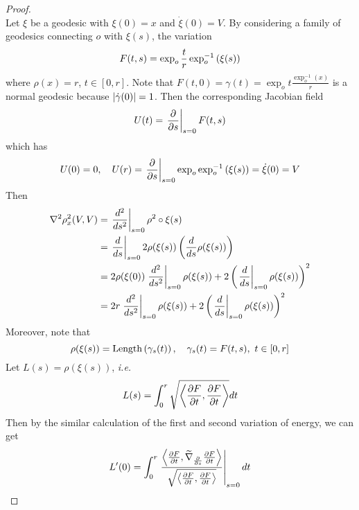 \begin{enumerate}[label=\arabic{*}.]
\begin{proof}
\begin{equation*}
		\end{equation*}
		Let $\xi$ be a geodesic with $\xi(0) = x$ and $\dot{\xi}(0) = V$. By considering a family of geodesics connecting $o$ with $\xi(s)$, the variation
		\begin{equation*}
			F(t,s) = \exp_o \frac{t}{r}\exp_o^{-1}\left(\xi(s)\right)
		\end{equation*}
		where $\rho(x) = r$, $t\in [0,r]$. Note that $F(t,0) = \gamma(t) = \exp_o t \frac{\exp_o^{-1}(x)}{r}$ is a normal geodesic because $\left\lvert\dot{\gamma}(0)\right\lvert = 1$. Then the corresponding Jacobian field
		\begin{equation*}
			U(t) = \left.\frac{\partial}{\partial s}\right\lvert_{s = 0} F(t,s)
		\end{equation*}
		which has
		\begin{equation*}
			U(0) = 0,\quad U(r) =  \left.\frac{\partial}{\partial s}\right\lvert_{s = 0} \exp_o \exp_o^{-1}\left(\xi(s)\right) = \dot{\xi}(0) = V
		\end{equation*}
		Then
		\begin{equation*}
			\begin{aligned}
				\nabla^2\rho^2_x(V,V) &= \left.\frac{d^2}{ds^2}\right\lvert_{s=0}\rho^2 \circ \xi(s)\\
				&= \left.\frac{d}{ds}\right\lvert_{s=0}2\rho(\xi(s))\left(\frac{d}{ds}\rho(\xi(s))\right) \\
				&= 2\rho(\xi(0))\left.\frac{d^2}{ds^2}\right\lvert_{s=0}\rho(\xi(s)) + 2\left(\left.\frac{d}{ds}\right\lvert_{s=0}\rho(\xi(s))\right)^2\\ 
				&= 2r\left.\frac{d^2}{ds^2}\right\lvert_{s=0}\rho(\xi(s)) + 2\left(\left.\frac{d}{ds}\right\lvert_{s=0}\rho(\xi(s))\right)^2 
			\end{aligned}
		\end{equation*}
		Moreover, note that
		\begin{equation*}
			\rho(\xi(s)) = \operatorname{Length}\left(\gamma_s(t)\right),\quad \gamma_s(t) = F(t,s),~t\in [0,r]
		\end{equation*}
		Let $L(s) = \rho(\xi(s))$, \emph{i.e.}
		\begin{equation*}
			L(s) = \int_0^r \sqrt{\left\langle \frac{\partial F}{\partial t},\frac{\partial F}{\partial t} \right\rangle}dt
		\end{equation*}
		Then by the similar calculation of the first and second variation of energy, we can get
		\begin{equation*}
			\begin{aligned}
				L^\prime(0) &= \int_0^r \lv{\frac{\inn{\frac{\partial F}{\partial t},\widetilde{\nabla}_{\frac{\partial}{\partial s}}\frac{\partial F}{\partial t}}}{\sqrt{\inn{\frac{\partial F}{\partial t},\frac{\partial F}{\partial t}}}}}_{s=0} dt \\

\end{aligned}
\end{equation*}
\end{proof}
\end{enumerate}

